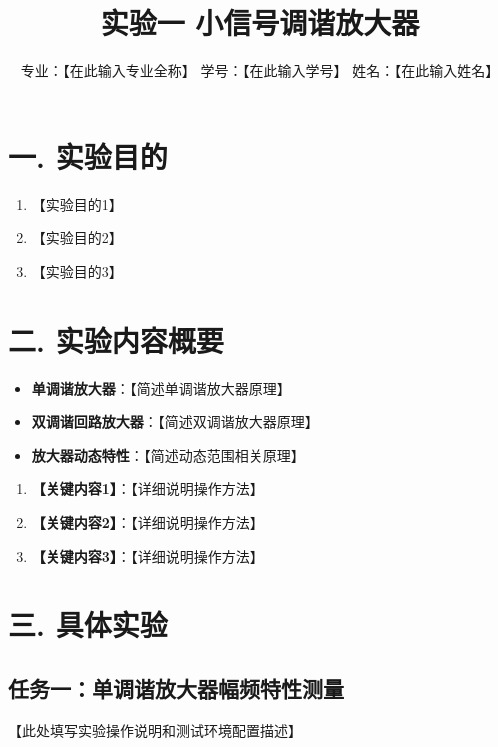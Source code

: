 \documentclass[12pt]{article}
\title{\Huge \textbf{实验一 小信号调谐放大器}}
\author{专业：【在此输入专业全称】 \quad 学号：【在此输入学号】 \quad 姓名：【在此输入姓名】}
\date{}
\begin{document}
\maketitle

\section*{一. 实验目的}
\begin{enumerate}
    \item 【实验目的1】
    \item 【实验目的2】
    \item 【实验目的3】
\end{enumerate}

\section*{二. 实验内容概要}

\vspace{1em}
\begin{itemize}
    \item \textbf{单调谐放大器}：【简述单调谐放大器原理】
    \item \textbf{双调谐回路放大器}：【简述双调谐放大器原理】
    \item \textbf{放大器动态特性}：【简述动态范围相关原理】
\end{itemize}

\vspace{1em}
\begin{enumerate}
    \item[(1)] \textbf{【关键内容1】}：【详细说明操作方法】
    \item[(2)] \textbf{【关键内容2】}：【详细说明操作方法】
    \item[(3)] \textbf{【关键内容3】}：【详细说明操作方法】
\end{enumerate}

\section*{三. 具体实验}

\subsection*{任务一：单调谐放大器幅频特性测量}

【此处填写实验操作说明和测试环境配置描述】
\end{document}
